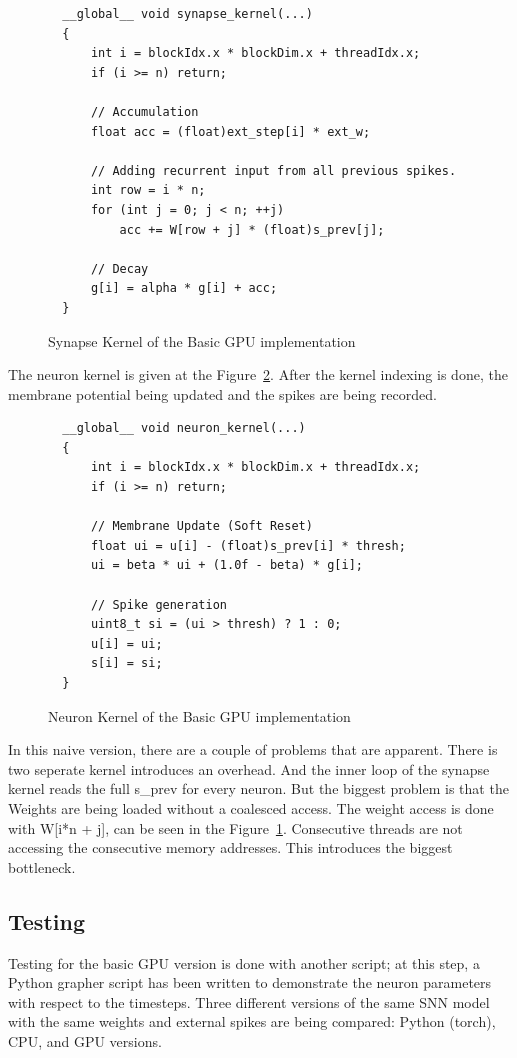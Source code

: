 \documentclass[conference]{IEEEtran}
\begin{document}
  \begin{figure}[h]
\centering
\begin{lstlisting}
  __global__ void synapse_kernel(...)
  {
      int i = blockIdx.x * blockDim.x + threadIdx.x;
      if (i >= n) return;

      // Accumulation
      float acc = (float)ext_step[i] * ext_w;

      // Adding recurrent input from all previous spikes.
      int row = i * n;
      for (int j = 0; j < n; ++j)
          acc += W[row + j] * (float)s_prev[j];

      // Decay 
      g[i] = alpha * g[i] + acc;
  }
\end{lstlisting}
\caption{Synapse Kernel of the Basic GPU implementation}
\label{fig:Synapse_Basic_GPU_impl}
\end{figure}

The neuron kernel is given at the Figure~\ref{fig:Neuron_Basic_GPU_impl}. After the kernel indexing is done, the membrane potential being updated and the spikes are being recorded.


  \begin{figure}[h]
\centering
\begin{lstlisting}
  __global__ void neuron_kernel(...)
  {
      int i = blockIdx.x * blockDim.x + threadIdx.x;
      if (i >= n) return;

      // Membrane Update (Soft Reset)
      float ui = u[i] - (float)s_prev[i] * thresh;
      ui = beta * ui + (1.0f - beta) * g[i];

      // Spike generation
      uint8_t si = (ui > thresh) ? 1 : 0;
      u[i] = ui;
      s[i] = si;
  }
\end{lstlisting}
\caption{Neuron Kernel of the Basic GPU implementation}
\label{fig:Neuron_Basic_GPU_impl}
\end{figure}

In this naive version, there are a couple of problems that are apparent. There is two seperate kernel introduces an overhead.
And the inner loop of the synapse kernel reads the full s\_prev for every neuron.
But the biggest problem is that the Weights are being loaded without a coalesced access. 
The weight access is done with W[i*n + j], can be seen in the Figure~\ref{fig:Synapse_Basic_GPU_impl}. 
Consecutive threads are not accessing the consecutive memory addresses. 
This introduces the biggest bottleneck. 

\subsection{Testing}
Testing for the basic GPU version is done with another script; 
at this step, a Python grapher script has been written to demonstrate the neuron parameters with respect to the timesteps.
Three different versions of the same SNN model with the same weights and external spikes are being compared: Python (torch), CPU, and GPU versions.
\end{document}
